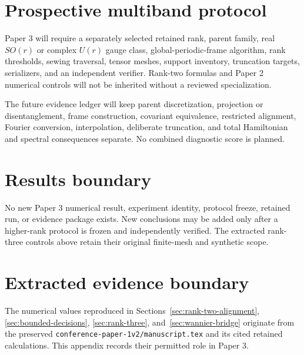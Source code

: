\documentclass[11pt]{article}
\newenvironment{prospective}{\color{prospectivered}}{}
\begin{document}
\begin{prospective}
\section{Prospective multiband protocol}
Paper 3 will require a separately selected retained rank, parent family, real $SO(r)$ or
complex $U(r)$ gauge class, global-periodic-frame algorithm, rank thresholds, sewing
traversal, tensor meshes, support inventory, truncation targets, serializers, and an
independent verifier. Rank-two formulas and Paper 2 numerical controls will not be
inherited without a reviewed specialization.

The future evidence ledger will keep parent discretization, projection or
disentanglement, frame construction, covariant equivalence, restricted alignment,
Fourier conversion, interpolation, deliberate truncation, and total Hamiltonian and
spectral consequences separate. No combined diagnostic score is planned.

\section{Results boundary}
No new Paper 3 numerical result, experiment identity, protocol freeze, retained run, or
evidence package exists. New conclusions may be added only after a higher-rank protocol
is frozen and independently verified. The extracted rank-three controls above retain
their original finite-mesh and synthetic scope.
\end{prospective}

\clearpage
\appendix
\section{Extracted evidence boundary}\label{app:evidence-boundary}
The numerical values reproduced in Sections~\ref{sec:rank-two-alignment},
\ref{sec:bounded-decisions}, \ref{sec:rank-three}, and~\ref{sec:wannier-bridge}
originate from the preserved
\texttt{conference-paper-1v2/manuscript.tex} and its cited retained calculations. This
appendix records their permitted role in Paper 3.
\end{document}
